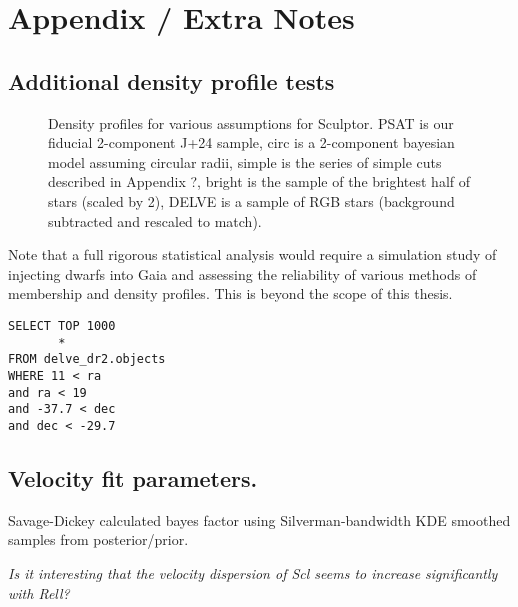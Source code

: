 \section{Appendix / Extra Notes}\label{appendix-extra-notes}

\subsection{Additional density profile
tests}\label{additional-density-profile-tests}

\begin{figure}
\centering
{}
\caption[Density profiles]{Density profiles for various assumptions for
Sculptor. PSAT is our fiducial 2-component J+24 sample, circ is a
2-component bayesian model assuming circular radii, simple is the series
of simple cuts described in Appendix ?, bright is the sample of the
brightest half of stars (scaled by 2), DELVE is a sample of RGB stars
(background subtracted and rescaled to
match).}\label{fig:sculptor_observed_profiles}
\end{figure}

Note that a full rigorous statistical analysis would require a
simulation study of injecting dwarfs into Gaia and assessing the
reliability of various methods of membership and density profiles. This
is beyond the scope of this thesis.

\begin{verbatim}
SELECT TOP 1000
       *
FROM delve_dr2.objects
WHERE 11 < ra
and ra < 19
and -37.7 < dec
and dec < -29.7
\end{verbatim}

\subsection{Velocity fit parameters.}\label{velocity-fit-parameters.}

Savage-Dickey calculated bayes factor using Silverman-bandwidth KDE
smoothed samples from posterior/prior.

\emph{Is it interesting that the velocity dispersion of Scl seems to
increase significantly with Rell?}

